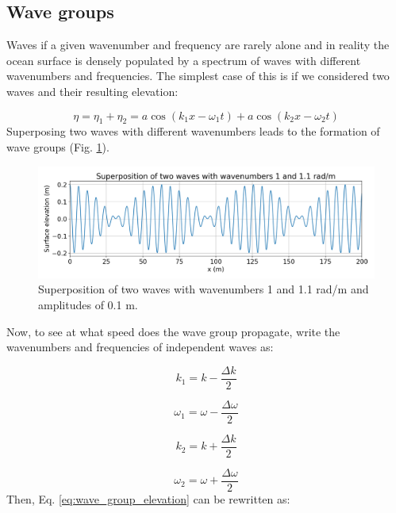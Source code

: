 \documentclass[12pt]{article}
\numberwithin{equation}{section}
\numberwithin{figure}{section}
\numberwithin{table}{section}
\begin{document}
\subsection{Wave groups}

Waves if a given wavenumber and frequency are rarely alone and in reality the
ocean surface is densely populated by a spectrum of waves with different
wavenumbers and frequencies.
The simplest case of this is if we considered two waves and their resulting
elevation:

\begin{equation}
  \eta = \eta_1 + \eta_2 = a \cos(k_1 x - \omega_1 t) + a \cos(k_2 x - \omega_2 t)
  \label{eq:wave_group_elevation}
\end{equation}
Superposing two waves with different wavenumbers leads to the formation
of wave groups (Fig. \ref{fig:wave_group}).

\begin{figure}[h]
  \centering
  \includegraphics[width=\textwidth]{assets/fig_wave_group.png}
  \caption{
    Superposition of two waves with wavenumbers 1 and 1.1 rad/m and amplitudes
    of 0.1 m.
  }
  \label{fig:wave_group}
\end{figure}

Now, to see at what speed does the wave group propagate, write the wavenumbers
and frequencies of independent waves as:

\begin{equation}
  k_1 = k - \frac{\Delta k}{2}
\end{equation}

\begin{equation}
  \omega_1 = \omega - \frac{\Delta \omega}{2}
\end{equation}

\begin{equation}
  k_2 = k + \frac{\Delta k}{2}
\end{equation}

\begin{equation}
  \omega_2 = \omega + \frac{\Delta \omega}{2}
\end{equation}
Then, Eq. \ref{eq:wave_group_elevation} can be rewritten as:
\end{document}
